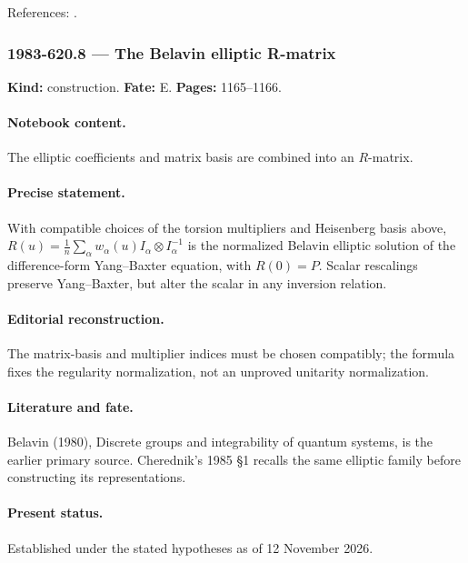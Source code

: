 \noindent References: \citep{belavin1980discrete,cherednik1985finite}.\par

\subsubsection{1983-620.8 --- The Belavin elliptic R-matrix}

\label{item:1983-620.8}

\noindent\textbf{Kind:} construction. \textbf{Fate:} E. \textbf{Pages:} 1165--1166.\par

\paragraph{Notebook content.} The elliptic coefficients and matrix basis are combined into an \(R\)-matrix.

\paragraph{Precise statement.} With compatible choices of the torsion multipliers and Heisenberg basis above, \(R(u)=\frac1n\sum_\alpha w_\alpha(u)I_\alpha\otimes I_\alpha^{-1}\) is the normalized Belavin elliptic solution of the difference-form Yang–Baxter equation, with \(R(0)=P\). Scalar rescalings preserve Yang–Baxter, but alter the scalar in any inversion relation.

\paragraph{Editorial reconstruction.} The matrix-basis and multiplier indices must be chosen compatibly; the formula fixes the regularity normalization, not an unproved unitarity normalization.

\paragraph{Literature and fate.} Belavin (1980), Discrete groups and integrability of quantum systems, is the earlier primary source. Cherednik’s 1985 \S1 recalls the same elliptic family before constructing its representations.

\paragraph{Present status.} Established under the stated hypotheses as of 12 November 2026.

